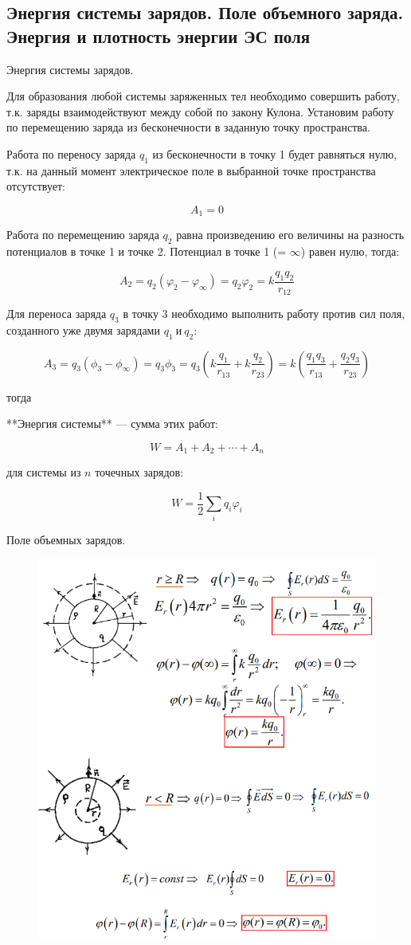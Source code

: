 \subsection{Энергия системы зарядов. Поле объемного заряда. Энергия и плотность энергии ЭС поля}

\begin{definition}
    Энергия системы зарядов.

    Для образования любой системы заряженных тел необходимо совершить работу, т.к. заряды взаимодействуют между собой по закону Кулона. 
    Установим работу по перемещению заряда из бесконечности в заданную точку пространства. 

    Работа по переносу заряда $q_1$ из бесконечности в точку 1 будет равняться нулю, т.к. на данный момент электрическое поле в выбранной 
    точке пространства отсутствует:

    $$A_1 = 0$$
\end{definition}

Работа по перемещению заряда $q_2$ равна произведению его величины на разность потенциалов в точке 1 и точке 2. 
Потенциал в точке 1 (= $\infty$) равен нулю, тогда:

$$A_2=q_2(\varphi_2-\varphi_\infty)=q_2\varphi_2=k\frac{q_1q_2}{r_{12}}$$

Для переноса заряда $q_3$ в точку 3 необходимо выполнить работу против сил поля, созданного уже двумя зарядами $q_1\ и\ q_2$:

$$A_3=q_3(\phi_3 - \phi_\infty) = q_3\phi_3 = q_3 \left( k\frac{q_1}{r_{13}} + k\frac{q_2}{r_{23}} \right) = k\left( \frac{q_1 q_3}{r_{13}} + \frac{q_2 q_3}{r_{23}} \right)$$

тогда

**Энергия системы** — сумма этих работ:

$$
W=A_1+A_2+\cdots+A_n
$$

для системы из $n$ точечных зарядов:

$$
W=\frac{1}{2}\sum_iq_i\varphi_i
$$

Поле объемных зарядов.

\begin{figure}[h]
    \centering
    \includegraphics[width=0.5\linewidth]{imgs/q21i1.png}
\end{figure}

